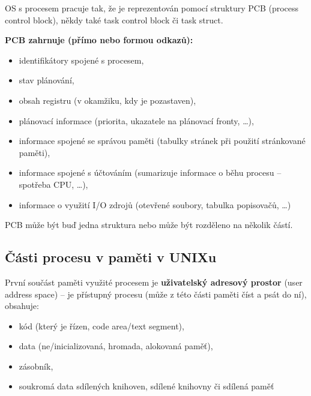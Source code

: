 \documentclass[a4paper, 11pt]{article}
\begin{document}
OS s procesem pracuje tak, že je reprezentován pomocí struktury PCB (process control block), někdy také task control block či task struct. \label{pcb}
 
\textbf{PCB zahrnuje (přímo nebo formou odkazů):}
\begin{itemize}
    \item identifikátory spojené s procesem,
    \item stav plánování,
    \item obsah registru (v okamžiku, kdy je pozastaven),
    \item plánovací informace (priorita, ukazatele na plánovací fronty, \ldots),
    \item informace spojené se správou paměti (tabulky stránek při použití stránkované paměti),
    \item informace spojené s účtováním (sumarizuje informace o běhu procesu -- spotřeba CPU, \ldots),
    \item informace o využití I/O zdrojů (otevřené soubory, tabulka popisovačů, \ldots)
\end{itemize}
 
PCB může být buď jedna struktura nebo může být rozděleno na několik částí.

\subsection{Části procesu v paměti v UNIXu}
První součást paměti využité procesem je \textbf{uživatelský adresový prostor} (user address space) -- je přístupný procesu (může z této části paměti číst a psát do ní), obsahuje:
\begin{itemize}
    \item kód (který je řízen, code area/text segment),
    \item data (ne/inicializovaná, hromada, alokovaná paměť),
    \item zásobník,
    \item soukromá data sdílených knihoven, sdílené knihovny či sdílená paměť
\end{itemize}
 
\end{document}
